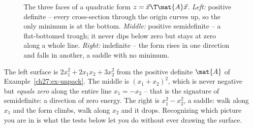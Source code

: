 \begin{figure}[H]
\centering
{}\hfill
{}\hfill
{}
\caption{The three faces of a quadratic form $z=\vec{x}\T\mat{A}\vec{x}$. \emph{Left:} positive
definite -- every cross-section through the origin curves up, so the only minimum is at the bottom.
\emph{Middle:} positive semidefinite -- a flat-bottomed trough; it never dips below zero but stays at
zero along a whole line. \emph{Right:} indefinite -- the form rises in one direction and falls in
another, a saddle with no minimum.}
\label{ch27:fig-three-surfaces}
\end{figure}

The left surface is $2x_1^2 + 2x_1x_2 + 3x_2^2$ from the positive definite $\mat{A}$ of
Example~\ref{ch27:ex-unpack}. The middle is
$(x_1+x_2)^2$, which is never negative but \emph{equals zero} along the entire line $x_1 = -x_2$ --
that is the signature of semidefinite: a direction of zero energy. The right is $x_1^2 - x_2^2$, a
saddle: walk along $x_1$ and the form climbs, walk along $x_2$ and it drops. Recognizing which
picture you are in is what the tests below let you do without ever drawing the surface.

